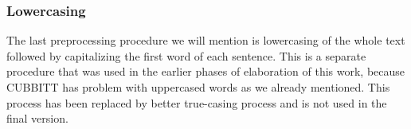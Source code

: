 \subsubsection*{Lowercasing}
The last preprocessing procedure we will mention is lowercasing of the whole text followed by capitalizing the first word of each sentence. This is a separate procedure that was used in the earlier phases of elaboration of this work, because CUBBITT has problem with uppercased words as we already mentioned. This process has been replaced by better true-casing process and is not used in the final version.















